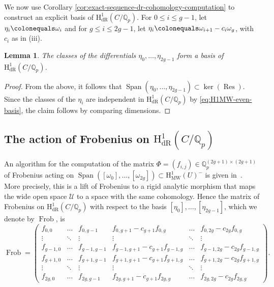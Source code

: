 \documentclass[11pt, a4paper]{amsart}
\newcommand{\Q}{\mathbb{Q}}
\newcommand{\calU}{\mathcal{U}}
\newcommand{\hdr}{\operatorname{H^1_{dR}}}
\newcommand{\Span}{\operatorname{Span}}
\newcommand{\hmw}{\operatorname{H^1_{MW}}}
\newcommand{\Res}{\operatorname{Res}}
\newcommand{\Frob}{\operatorname{Frob}}
\newtheorem{lemma}[theorem]{Lemma}
\theoremstyle{remark}
\numberwithin{equation}{section}
\newcommand{\sm}{{}}
\begin{document}
We now use Corollary \ref{cor:exact-sequence-dr-cohomology-computation}  to
construct an explicit basis of $\hdr(C/\Q_p)$. For $0\leq i \leq g-1$, let
$\eta_i\colonequals \omega_i$ and for $g\leq i \leq 2g-1$, let $\eta_i
\colonequals\omega_{i+1} -
c_i\omega_g$, with $c_i$ as in (iii). 

\begin{lemma}\label{lm:dR-from-MW}
The classes of the differentials $\eta_0,\ldots,\eta_{2g-1}$ form a basis of $\hdr(C/\Q_p)$.
\end{lemma}
\begin{proof}
From the above, it follows that $\Span(\eta_0,\ldots,\eta_{2g-1})\subset \ker(\Res)$. Since the classes of the $\eta_i$ are independent in $\hdr(C/\Q_p)$ by \eqref{eq:H1MW-even-basis}, the claim follows by comparing dimensions. 
\end{proof}

\subsection{The action of Frobenius on $\hdr(C/\Q_p)$}\label{frob}
An algorithm for the computation of the matrix $\Phi=(f_{i,j})\in
\Q_p^{(2g+1)\times(2g+1)}$ of Frobenius acting on $\Span([\omega_0], \ldots,[\omega_{2g}])
\subset \hmw(U)^-$
is given in~\cite{Harrison-Even-Deg-MW}. \sm{More precisely, this is a
lift of Frobenius to a rigid analytic morphism that maps the wide open space
$\calU$ to a space with the same cohomology.}
Hence the matrix of Frobenius on $\hdr(C/\Q_p)$ with respect to the basis $[\eta_0],\ldots,[\eta_{2g-1}]$, which we denote by $\Frob$, is 
$$\Frob=\begin{pmatrix} 
f_{0,0} & \ldots & f_{0,g-1} &  f_{0,g+1}-c_{g+1}f_{0,g} & \ldots & f_{0,2g}-c_{2g}f_{0,g} \\
\vdots & \ddots & \vdots & \vdots & \ddots & \vdots\\
f_{g-1,0} & \ldots & f_{g-1,g-1}  & f_{g-1,g+1}-c_{g+1}f_{g-1,g} & \ldots & f_{g-1,2g}-c_{2g}f_{g-1,g}\\
f_{g+1,0} & \ldots & f_{g+1,g-1}  & f_{g+1,g+1}-c_{g+1}f_{g+1,g} & \ldots & f_{g+1,2g}-c_{2g}f_{g+1,g}\\
\vdots & \ddots & \vdots & \vdots  & \ddots & \vdots\\
f_{2g,0} & \ldots & f_{2g,g-1} & f_{2g,g+1}-c_{g+1}f_{2g,g} & \ldots & f_{2g,2g}-c_{2g}f_{2g,g}
\end{pmatrix}.$$
\end{document}
